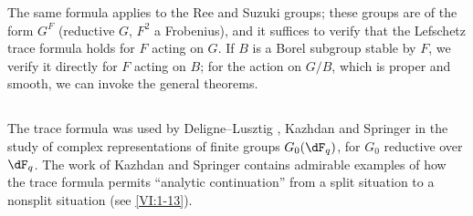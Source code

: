The same formula applies to the Ree and Suzuki groups; these groups are 
of the form $G^F$ (reductive $G$, $F^2$ a Frobenius), and it suffices to 
verify that the Lefschetz trace formula holds for $F$ acting 
on $G$. If $B$ is a Borel subgroup stable by $F$, we verify it 
directly for $F$ acting on $B$; for the action on $G/B$, which is proper and 
smooth, we can invoke the general theorems. 





\subsection{}\label{VI:8-3}

The trace formula was used by Deligne--Lusztig \cite{dl76}, 
Kazhdan \cite{ka77} and Springer \cite{sp76} in the study of 
complex representations of finite groups $G_0(\dF_q)$, for $G_0$ 
reductive over $\dF_q$. The work of Kazhdan and Springer contains 
admirable examples of how the trace formula permits ``analytic 
continuation'' from a split situation to a nonsplit situation 
(see \ref{VI:1-13}).
